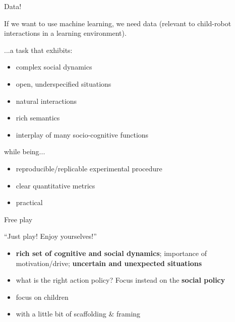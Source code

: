 \documentclass[xcolor=table]{beamer}
\begin{document}
\begin{frame}{Data!}

    If we want to use machine learning, we need data (relevant to child-robot
    interactions in a learning environment).
    
    \pause

    ...a task that exhibits:

    \begin{itemize}
        \item complex social dynamics
        \item open, underspecified situations
        \item natural interactions
        \item rich semantics
        \item interplay of many socio-cognitive functions
    \end{itemize}

    \pause

    while being...
    \begin{itemize}
        \item reproducible/replicable experimental procedure
        \item clear quantitative metrics
        \item practical
    \end{itemize}
\end{frame}


\begin{frame}{Free play}

    \begin{center}
    {\Large ``Just play! Enjoy yourselves!''}
    \end{center}

    \vspace{3em}

    \begin{itemize}
        \item \textbf{rich set of cognitive and
            social dynamics}; importance of motivation/drive; \textbf{uncertain
            and unexpected situations}
        \item what is the right action policy? Focus instead on the \textbf{social policy}
    \end{itemize}
    \pause
    \begin{itemize}
        \item focus on children
        \item with a little bit of scaffolding \& framing
    \end{itemize}


\end{frame}
\end{document}

